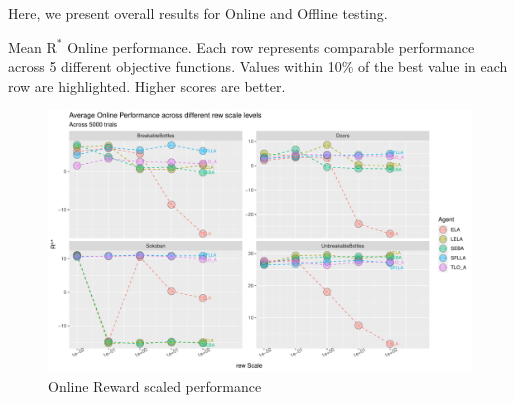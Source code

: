 Here, we present overall results for Online and Offline testing. 


\begin{table}[t]
\tiny
  \caption{Mean $\text{R}^*$ Online performance. Each row represents comparable performance across 5 different objective functions. Values within 10\% of the best value in each row are highlighted. Higher scores are better.}
  \label{tab:mean_r_star_performance}

\end{table}
\begin{figure}[h]
  \centering
  \includegraphics[width=\linewidth]{output/online performance_rew.pdf}
  \caption{Online Reward scaled performance}
  \label{fig:offline_pen_performance}
\end{figure}

